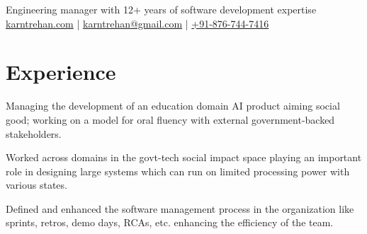 \documentclass[]{deedy-resume-reversed}
\begin{document}
%
%

%
%
{Engineering manager with 12+ years of software development expertise }
{\href{https://karntrehan.com}{karntrehan.com} | 
\href{mailto:karntrehan@gmail.com}{karntrehan@gmail.com} | \href{tel:+918767447416}{+91-876-744-7416}
}

%
%

\begin{minipage}[t]{0.60\textwidth}


\section{Experience}
\vspace{\topsep} %


\textbullet{}
\vspace{\topsep} %
\begin{tightemize}
\item Managing the development of an education domain AI product aiming social good; working on a model for oral fluency with external government-backed stakeholders.
\end{tightemize}

\textbullet{}
\begin{tightemize}
\item Worked across domains in the govt-tech social impact space playing an important role in designing large systems which can run on limited processing power with various states.
\item Defined and enhanced the software management process in the organization like sprints, retros, demo days, RCAs, etc. enhancing the efficiency of the team.
\end{tightemize}
\sectionsep


\end{minipage}
\end{document}
